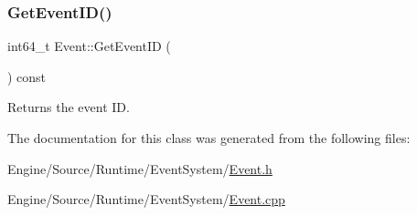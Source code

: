 \subsubsection{\texorpdfstring{Get\+Event\+I\+D()}{GetEventID()}}
{\footnotesize\ttfamily int64\+\_\+t Event\+::\+Get\+Event\+ID (\begin{DoxyParamCaption}{ }\end{DoxyParamCaption}) const\hspace{0.3cm}{\ttfamily [inline]}}

Returns the event ID. 

The documentation for this class was generated from the following files\+:\begin{DoxyCompactItemize}
\item 
Engine/\+Source/\+Runtime/\+Event\+System/\mbox{\hyperlink{_event_8h}{Event.\+h}}\item 
Engine/\+Source/\+Runtime/\+Event\+System/\mbox{\hyperlink{_event_8cpp}{Event.\+cpp}}\end{DoxyCompactItemize}
